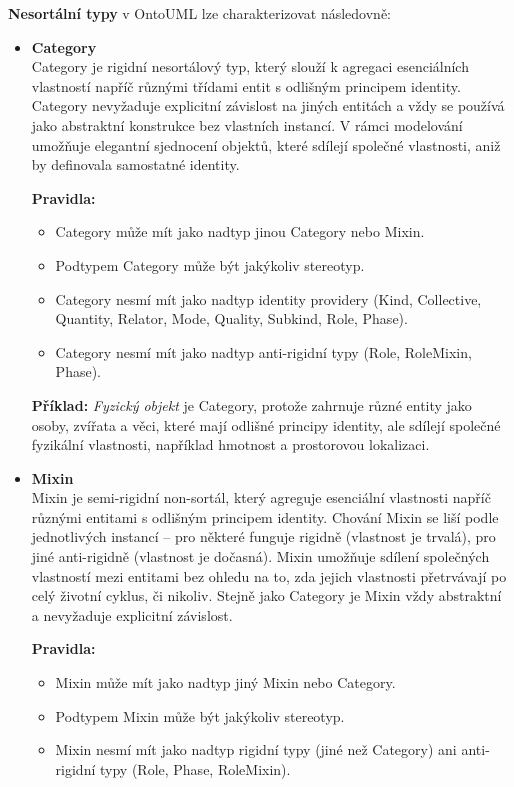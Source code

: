 \vspace{1em}
\noindent \textbf{Nesortální typy} v OntoUML lze charakterizovat následovně:
\begin{itemize}
  \item \textbf{Category} \\
  Category je rigidní nesortálový typ, který slouží k agregaci esenciálních vlastností napříč různými třídami entit s odlišným principem identity. Category nevyžaduje explicitní závislost na jiných entitách a vždy se používá jako abstraktní konstrukce bez vlastních instancí. V rámci modelování umožňuje elegantní sjednocení objektů, které sdílejí společné vlastnosti, aniž by definovala samostatné identity. \cite{KOM_prezentace3,ontouml_class_stereotypes}

  \textbf{Pravidla:}
  \begin{itemize}
    \item Category může mít jako nadtyp jinou Category nebo Mixin.
    \item Podtypem Category může být jakýkoliv stereotyp.
    \item Category nesmí mít jako nadtyp identity providery (Kind, Collective, Quantity, Relator, Mode, Quality, Subkind, Role, Phase).
    \item Category nesmí mít jako nadtyp anti-rigidní typy (Role, RoleMixin, Phase). \cite{ontouml_class_stereotypes}
  \end{itemize}

  \textbf{Příklad:} \textit{Fyzický objekt} je Category, protože zahrnuje různé entity jako osoby, zvířata a věci, které mají odlišné principy identity, ale sdílejí společné fyzikální vlastnosti, například hmotnost a prostorovou lokalizaci.


  \item \textbf{Mixin} \\
  Mixin je semi-rigidní non-sortál, který agreguje esenciální vlastnosti napříč různými entitami s odlišným principem identity. Chování Mixin se liší podle jednotlivých instancí – pro některé funguje rigidně (vlastnost je trvalá), pro jiné anti-rigidně (vlastnost je dočasná). Mixin umožňuje sdílení společných vlastností mezi entitami bez ohledu na to, zda jejich vlastnosti přetrvávají po celý životní cyklus, či nikoliv. Stejně jako Category je Mixin vždy abstraktní a nevyžaduje explicitní závislost. \cite{KOM_prezentace3,ontouml_class_stereotypes}

  \textbf{Pravidla:}
  \begin{itemize}
    \item Mixin může mít jako nadtyp jiný Mixin nebo Category.
    \item Podtypem Mixin může být jakýkoliv stereotyp.
    \item Mixin nesmí mít jako nadtyp rigidní typy (jiné než Category) ani anti-rigidní typy (Role, Phase, RoleMixin). \cite{ontouml_class_stereotypes}
  \end{itemize}


\end{itemize}
